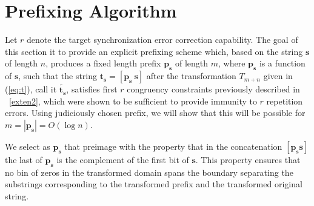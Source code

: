 \section{Prefixing Algorithm}\label{enc}

Let $r$ denote the target synchronization error correction
capability. The goal of this section it to provide an explicit
prefixing  scheme which, based on the string $\mathbf{s}$ of length
$n$, produces a fixed length prefix $\mathbf{p_s}$ of length $m$,
where $\mathbf{p_s}$ is a function of $\mathbf{s}$, such that the
string $\mathbf{t_s}=[ \mathbf{p_s} ~ \mathbf{s} ]$ after the
transformation $T_{m+n}$ given in (\ref{eq:t}), call it
$\tilde{\mathbf{t_s}}$, satisfies first $r$ congruency constraints
previously described  in ~\eqref{exten2}, which were shown to be
sufficient to provide immunity to $r$ repetition errors. Using
judiciously chosen prefix, we will show
that this will be possible for $m=|\mathbf{p_s}|=O(\log n)$. %

We select as $\mathbf{p_s}$ that preimage with the property that in
the concatenation $[\mathbf{p_s} \mathbf{s}]$ the last of
$\mathbf{p_s}$ is the complement of the first bit of $\mathbf{s}$.
This property ensures that no bin of zeros in the transformed domain
spans the boundary separating the substrings corresponding to the
transformed prefix and the transformed original string.







